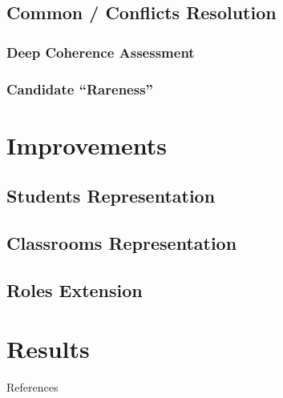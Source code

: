 \documentclass{beamer}
\begin{document}
\subsection{Common / Conflicts Resolution}
\subsubsection{Deep Coherence Assessment}
\subsubsection{Candidate ``Rareness''}

\section{Improvements}
\subsection{Students Representation}
\subsection{Classrooms Representation}
\subsection{Roles Extension}

\section{Results}



\begin{frame}{References}

\end{frame}
\end{document}
